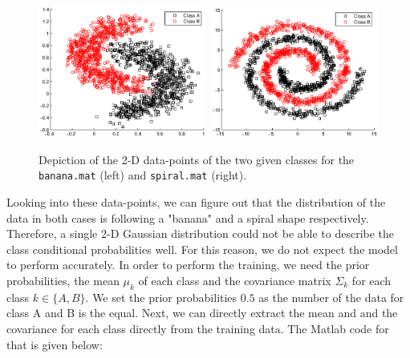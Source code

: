 \documentclass[a4paper,11pt]{article}
\begin{document}
\begin{figure}[h!]
  \centering   
      \includegraphics[width=0.49\textwidth]{figures/ABclasses.eps}\		
      \includegraphics[width=0.49\textwidth]{figures/ABclassesSp.eps}
      
  \caption{Depiction of the 2-D data-points of the two given classes for the \texttt{banana.mat} (left) and \texttt{spiral.mat} (right).}
  \label{fig1}
\end{figure}

Looking into these data-points, we can figure out that the distribution of the data in both cases is following a "banana" and a spiral shape respectively. Therefore, a single 2-D Gaussian distribution could not be able to describe the class conditional probabilities well. For this reason, we do not expect the model to perform accurately. In order to perform the training, we need the prior probabilities, the mean $\mu_k$ of each class and the covariance matrix $\Sigma_k$  for each class $k \in \{A, B\}$. We set the prior probabilities $0.5$ as the number of the data for class A and B is the equal. Next, we can directly extract the mean and and the covariance for each class directly from the training data. The Matlab code for that is given below:\\
\end{document}
